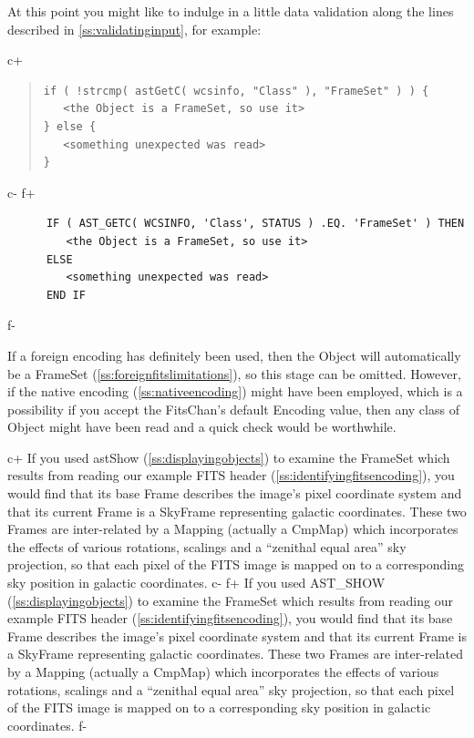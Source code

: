 \documentclass[twoside,11pt]{article}
\newcommand{\secref}[1]{\S\ref{#1}}
\renewcommand{\secref}[1]{\ref{#1}}
\begin{document}
At this point you might like to indulge in a little data validation
along the lines described in \secref{ss:validatinginput}, for example:

c+
\begin{quote}
\small
\begin{verbatim}
if ( !strcmp( astGetC( wcsinfo, "Class" ), "FrameSet" ) ) {
   <the Object is a FrameSet, so use it>
} else {
   <something unexpected was read>
}
\end{verbatim}
\normalsize
\end{quote}
c-
f+
\small
\begin{verbatim}
      IF ( AST_GETC( WCSINFO, 'Class', STATUS ) .EQ. 'FrameSet' ) THEN
         <the Object is a FrameSet, so use it>
      ELSE
         <something unexpected was read>
      END IF
\end{verbatim}
\normalsize
f-

If a foreign encoding has definitely been used, then the Object will
automatically be a FrameSet (\secref{ss:foreignfitslimitations}), so
this stage can be omitted. However, if the native encoding
(\secref{ss:nativeencoding}) might have been employed, which is a
possibility if you accept the FitsChan's default Encoding value, then
any class of Object might have been read and a quick check would be
worthwhile.

c+
If you used astShow (\secref{ss:displayingobjects}) to examine the
FrameSet which results from reading our example FITS header
(\secref{ss:identifyingfitsencoding}), you would find that its base
Frame describes the image's pixel coordinate system and that its
current Frame is a SkyFrame representing galactic coordinates. These
two Frames are inter-related by a Mapping (actually a CmpMap) which
incorporates the effects of various rotations, scalings and a
``zenithal equal area'' sky projection, so that each pixel of the FITS
image is mapped on to a corresponding sky position in galactic
coordinates.
c-
f+
If you used AST\_SHOW (\secref{ss:displayingobjects}) to examine the
FrameSet which results from reading our example FITS header
(\secref{ss:identifyingfitsencoding}), you would find that its base
Frame describes the image's pixel coordinate system and that its
current Frame is a SkyFrame representing galactic coordinates. These
two Frames are inter-related by a Mapping (actually a CmpMap) which
incorporates the effects of various rotations, scalings and a
``zenithal equal area'' sky projection, so that each pixel of the FITS
image is mapped on to a corresponding sky position in galactic
coordinates.
f-
\end{document}
